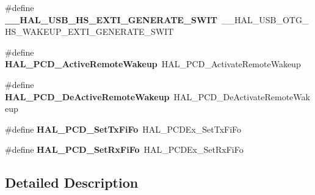 \begin{DoxyCompactItemize}
\item 
\#define {\bfseries \+\_\+\+\_\+\+H\+A\+L\+\_\+\+U\+S\+B\+\_\+\+H\+S\+\_\+\+E\+X\+T\+I\+\_\+\+G\+E\+N\+E\+R\+A\+T\+E\+\_\+\+S\+W\+IT}~\+\_\+\+\_\+\+H\+A\+L\+\_\+\+U\+S\+B\+\_\+\+O\+T\+G\+\_\+\+H\+S\+\_\+\+W\+A\+K\+E\+U\+P\+\_\+\+E\+X\+T\+I\+\_\+\+G\+E\+N\+E\+R\+A\+T\+E\+\_\+\+S\+W\+IT\hypertarget{group___h_a_l___u_s_b___aliased___macros_ga5439cec1ebe6cc15a3a9d3f30f9fa617}{}\label{group___h_a_l___u_s_b___aliased___macros_ga5439cec1ebe6cc15a3a9d3f30f9fa617}

\item 
\#define {\bfseries H\+A\+L\+\_\+\+P\+C\+D\+\_\+\+Active\+Remote\+Wakeup}~H\+A\+L\+\_\+\+P\+C\+D\+\_\+\+Activate\+Remote\+Wakeup\hypertarget{group___h_a_l___u_s_b___aliased___macros_gaf7a3fc7d87b9ef4947082e8bba921480}{}\label{group___h_a_l___u_s_b___aliased___macros_gaf7a3fc7d87b9ef4947082e8bba921480}

\item 
\#define {\bfseries H\+A\+L\+\_\+\+P\+C\+D\+\_\+\+De\+Active\+Remote\+Wakeup}~H\+A\+L\+\_\+\+P\+C\+D\+\_\+\+De\+Activate\+Remote\+Wakeup\hypertarget{group___h_a_l___u_s_b___aliased___macros_ga3aa67b4ed925bf6e4f9f22054037e243}{}\label{group___h_a_l___u_s_b___aliased___macros_ga3aa67b4ed925bf6e4f9f22054037e243}

\item 
\#define {\bfseries H\+A\+L\+\_\+\+P\+C\+D\+\_\+\+Set\+Tx\+Fi\+Fo}~H\+A\+L\+\_\+\+P\+C\+D\+Ex\+\_\+\+Set\+Tx\+Fi\+Fo\hypertarget{group___h_a_l___u_s_b___aliased___macros_ga7583d6ad8bc46cf004c4e7d4d75a29a4}{}\label{group___h_a_l___u_s_b___aliased___macros_ga7583d6ad8bc46cf004c4e7d4d75a29a4}

\item 
\#define {\bfseries H\+A\+L\+\_\+\+P\+C\+D\+\_\+\+Set\+Rx\+Fi\+Fo}~H\+A\+L\+\_\+\+P\+C\+D\+Ex\+\_\+\+Set\+Rx\+Fi\+Fo\hypertarget{group___h_a_l___u_s_b___aliased___macros_gaa57fb6445f12a2e697a1f61e0b748c4b}{}\label{group___h_a_l___u_s_b___aliased___macros_gaa57fb6445f12a2e697a1f61e0b748c4b}

\end{DoxyCompactItemize}


\subsection{Detailed Description}
